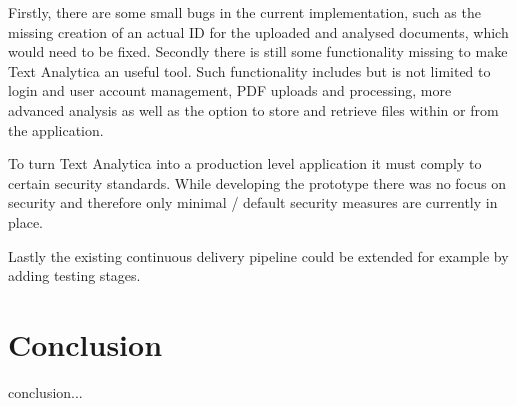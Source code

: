 \documentclass[conference]{IEEEtran}
\begin{document}
Firstly, there are some small bugs in the current implementation, such as the missing creation of an actual ID for the uploaded and analysed documents, which would need to be fixed. Secondly there is still some functionality missing to make Text Analytica an useful tool. Such functionality includes but is not limited to login and user account management, PDF uploads and processing, more advanced analysis as well as the option to store and retrieve files within or from the application.

To turn Text Analytica into a production level application it must comply to certain security standards. While developing the prototype there was no focus on security and therefore only minimal / default security measures are currently in place.

Lastly the existing continuous delivery pipeline could be extended for example by adding testing stages.

\section{Conclusion}
\label{sec:conclusion}
conclusion...



\end{document}
